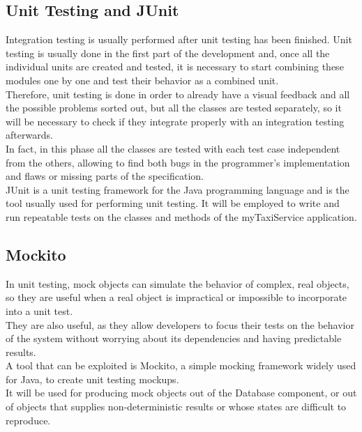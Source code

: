 \documentclass[18pt,oneside,a4paper, titlepage]{article}
\begin{document}
	\subsection{Unit Testing and JUnit}
		Integration testing is usually performed after unit testing has been finished. Unit testing is usually done in the first part of the development and, once all the individual units are created and tested, it is necessary to start combining these modules one by one and test their behavior as a combined unit.\\
		Therefore, unit testing is done in order to already have a visual feedback and all the possible problems sorted out, but all the classes are tested separately, so it will be necessary to check if they integrate properly with an integration testing afterwards.\\
		In fact, in this phase all the classes are tested with each test case independent from the others, allowing to find both bugs in the programmer's implementation and flaws or missing parts of the specification. \\
		JUnit is a unit testing framework for the Java programming language and is the tool usually used for performing unit testing. It will be employed to write and run repeatable tests on the classes and methods of the myTaxiService application.
		
	\subsection{Mockito}
		In unit testing, mock objects can simulate the behavior of complex, real objects, so they are useful when a real object is impractical or impossible to incorporate into a unit test.\\ They are also useful, as they allow developers to focus their tests on the behavior of the system without worrying about its dependencies and having  predictable results.\\
		A tool that can be exploited is Mockito, a simple mocking framework widely used for Java, to create unit testing mockups. \\
		It will be used for producing mock objects out of the Database component, or out of objects that supplies non-deterministic results or whose states are difficult to reproduce.
	
\end{document}
